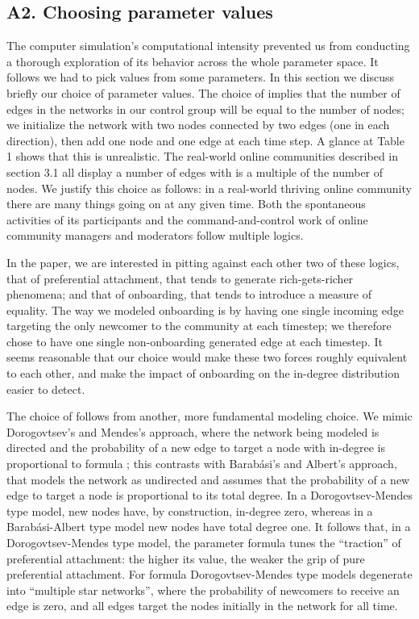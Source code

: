 \subsection*{A2. Choosing parameter values}

The computer simulation's computational intensity prevented us from conducting a thorough exploration of its behavior across the whole parameter space. It follows we had to pick values from some parameters. In this section we discuss briefly our choice of parameter values.
The choice of  implies that the number of edges in the networks in our control group will be equal to the number of nodes; we initialize the network with two nodes connected by two edges (one in each direction), then add one node and one edge at each time step. A glance at  Table 1 shows that this is unrealistic. The real-world online communities described in section 3.1 all display a number of edges with is a multiple of the number of nodes. We justify this choice as follows: in a real-world thriving online community there are many things going on at any given time. Both the spontaneous activities of its participants and the command-and-control work of online community managers and moderators follow multiple logics. 
 
In the paper, we are interested in pitting against each other two of these logics, that of preferential attachment, that tends to generate rich-gets-richer phenomena; and that of onboarding, that tends to introduce a measure of equality. The way we modeled onboarding is by having one single incoming edge targeting the only newcomer to the community at each timestep; we therefore chose to have one single non-onboarding generated edge at each timestep. It seems reasonable that our choice would make  these two forces roughly equivalent to each other, and make the impact of onboarding on the in-degree distribution easier to detect.

The choice of follows from another, more fundamental modeling choice. We mimic Dorogovtsev's and Mendes's approach, where the network being modeled is directed and the probability of a new edge to target a node with in-degree  is proportional to formula \cite{dorogovtsev2002evolution}; this contrasts with Barabási's and Albert's approach, that models the network as undirected and assumes that the probability of a new edge to target a node is proportional to its total degree. In a Dorogovtsev-Mendes type model, new nodes have, by construction, in-degree zero, whereas in a Barabási-Albert type model new nodes have total degree one. It follows that, in a Dorogovtsev-Mendes type model, the parameter formula tunes the “traction” of preferential attachment: the higher its value, the weaker the grip of pure preferential attachment. For formula Dorogovtsev-Mendes type models degenerate into “multiple star networks”, where the probability of newcomers to receive an edge is zero, and all edges target the nodes initially in the network for all time. 

